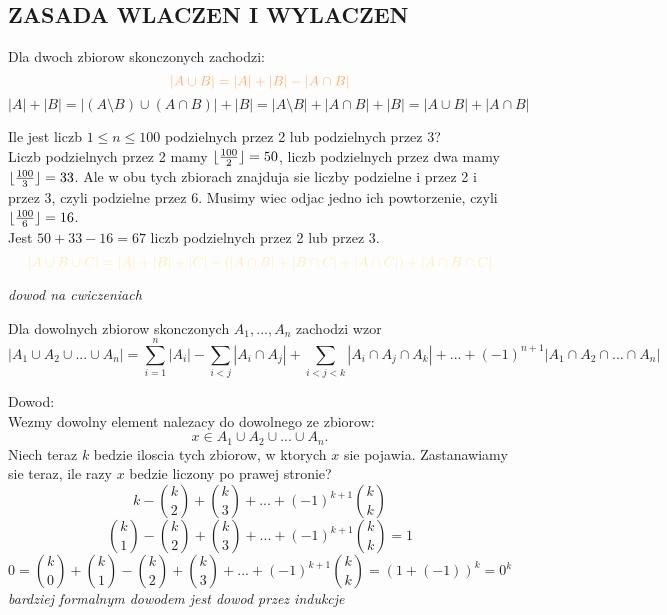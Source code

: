 \documentclass{article}
\begin{document}
\subsection*{ZASADA WLACZEN I WYLACZEN}
    \begin{center}Dla dwoch zbiorow skonczonych zachodzi:
        $$\color{def}|A\cup B|=|A|+|B|-|A\cap B|$$
        $$|A|+|B|=|(A\setminus B)\cup(A\cap B)|+|B|=|A\setminus B|+|A\cap B|+|B|=|A\cup B|+|A\cap B|$$
    \end{center}
    Ile jest liczb $1\leq n\leq100$ podzielnych przez 2 lub podzielnych przez 3?\smallskip\\
    Liczb podzielnych przez 2 mamy $\lfloor{100\over2}\rfloor=50$, liczb podzielnych przez dwa mamy $\lfloor{100\over 3}\rfloor=33$. Ale w obu tych zbiorach znajduja sie liczby podzielne i przez 2 i przez 3, czyli podzielne przez 6. Musimy wiec odjac jedno ich powtorzenie, czyli $\lfloor{100\over6}\rfloor=16$.\smallskip\\
    Jest $50+33-16=67$ liczb podzielnych przez 2 lub przez 3.\medskip\\
    $$\color{acc}|A\cup B\cup C|=|A|+|B|+|C|-(|A\cap B|+|B\cap C|+|A\cap C|)+|A\cap B\cap C|$$
    \begin{center}
    \end{center}
    \emph{dowod na cwiczeniach}
    \begin{center}
        Dla dowolnych zbiorow skonczonych $A_1, ..., A_n$ zachodzi wzor
        $$|A_1\cup A_2\cup...\cup A_n|=\sum\limits_{i=1}^n|A_i|-\sum\limits_{i<j}|A_i\cap A_j|+\sum\limits_{i<j<k}|A_i\cap A_j\cap A_k|+...+(-1)^{n+1}|A_1\cap A_2\cap...\cap A_n|$$
    \end{center}
    Dowod:\\
    Wezmy dowolny element nalezacy do dowolnego ze zbiorow:
    $$x\in A_1\cup A_2\cup ...\cup A_n.$$
    Niech teraz $k$ bedzie iloscia tych zbiorow, w ktorych $x$ sie pojawia. Zastanawiamy sie teraz, ile razy $x$ bedzie liczony po prawej stronie?
    $$k-{k\choose2}+{k\choose3}+...+(-1)^{k+1}{k\choose k}$$
    $${k\choose1}-{k\choose2}+{k\choose3}+...+(-1)^{k+1}{k\choose k}=1$$
    $$0={k\choose0}+{k\choose1}-{k\choose2}+{k\choose3}+...+(-1)^{k+1}{k\choose k}=(1+(-1))^k=0^k$$
    \emph{bardziej formalnym dowodem jest dowod przez indukcje}
\end{document}
